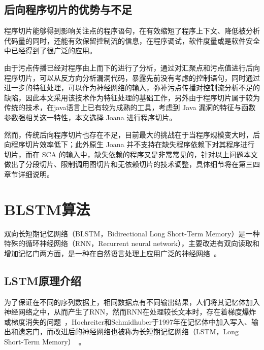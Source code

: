 \subsection{后向程序切片的优势与不足}
程序切片能够得到影响关注点的程序语句，在有效缩短了程序上下文、降低被分析代码量的同时，还能有效保留控制流的信息，在程序调试，软件度量或是软件安全中已经得到了很广泛的应用。

由于污点传播已经对程序由上而下的进行了分析，通过对汇聚点和污点值进行后向程序切片，可以从反方向分析漏洞代码，暴露先前没有考虑的控制语句，同时通过进一步的特征处理，可以作为神经网络的输入，弥补污点传播对控制流分析不足的缺陷，因此本文采用该技术作为特征处理的基础工作，另外由于程序切片属于较为传统的技术，在java语言上已有较为成熟的工具，考虑到 Java 漏洞的特征与函数参数强相关这一特性，本文选择 Joana 进行程序切片。

然而，传统后向程序切片也存在不足，目前最大的挑战在于当程序规模变大时，后向程序切片效率低下；此外原生 Joana 并不支持在缺失程序依赖下对其程序进行切片，而在 SCA 的输入中，缺失依赖的程序又是非常常见的，针对以上问题本文做出了分段切片、限制调用图切片和无依赖切片的技术调整，具体细节将在第三四章节详细说明。

\section{BLSTM算法}
双向长短期记忆网络（BLSTM，Bidirectional Long Short-Term Memory）是一种特殊的循环神经网络（RNN，Recurrent neural network），主要改进有双向读取和增加记忆门两方面，是一种在自然语言处理上应用广泛的神经网络~\cite{lstm:translate}。

\subsection{LSTM原理介绍}
为了保证在不同的序列数据上，相同数据点有不同输出结果，人们将其记忆体加入神经网络之中，从而产生了RNN，然而RNN在处理较长文本时，存在着梯度爆炸或梯度消失的问题~\cite{lstm:gradient}，Hochreiter和Schmidhuber于1997年在记忆体中加入写入、输出和遗忘门，而改进后的神经网络也被称为长短期记忆网络（LSTM，Long Short-Term Memory）~\cite{lstm:1997}。

